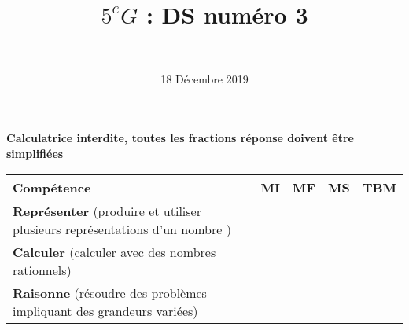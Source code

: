 \documentclass[a4paper,11pt]{exam}
\author{\ }
\date{18 Décembre 2019}
\title{$5^e G$ : DS num\'ero 3}
\begin{document}
%	

	\maketitle
	
\begin{center}
	\textbf{Calculatrice interdite, toutes les fractions réponse doivent être simplifiées}
\end{center}

\begin{small}
	\begin{center}
		\begin{tabular}{|@{\ }l@{\ }|@{\ }c@{\ }|@{\ }c@{\ }|@{\ }c@{\ }|@{\ }c@{\ }|}
			\hline
			\textbf{Compétence} & \textbf{MI} & \textbf{MF} & \textbf{MS} & \textbf{TBM} \\
			\hline
			\textbf{Représenter} (produire et utiliser plusieurs représentations d’un nombre ) &  \ \ & \ \ & \ \ & \ \  \\
			\hline
			\textbf{Calculer} (calculer avec des nombres rationnels)&  \ \ & \ \ & \ \ & \ \  \\
			\hline	
			\textbf{Raisonne} (résoudre des problèmes impliquant des grandeurs variées) & \ \ & \ \ &  \ \  & \ \ \\
			\hline
%			 
		\end{tabular}
	\end{center}
\end{small}	

	
	
	


%









\label{LastPage}

%
\end{document}
